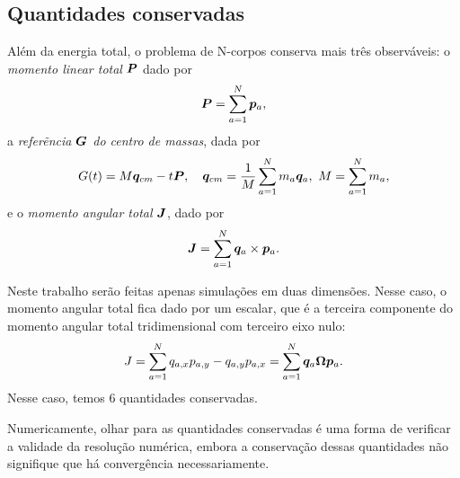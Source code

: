 \subsection{Quantidades conservadas}

Além da energia total, o problema de N-corpos conserva mais três observáveis: o \textit{momento linear total} $\bm P$ dado por
\begin{equation}
\bm P = \sum_{a=1}^N \bm p_a,
\end{equation}
a \textit{referẽncia $\bm G$ do centro de massas}, dada por
\begin{equation}
G(t) = M \bm q_{cm} - t \bm P,
\quad
\bm q_{cm} = \dfrac{1}{M} \sum_{a=1}^N m_a \bm q_a,
\
M = \sum_{a=1}^N m_a,
\end{equation}
e o \textit{momento angular total} $\bm J$, dado por
\begin{equation}
\bm J = \sum_{a=1}^N \bm q_a \times \bm p_a.
\end{equation}

Neste trabalho serão feitas apenas simulações em duas dimensões. Nesse caso, o momento angular total fica dado por um escalar, que é a terceira componente do momento angular total tridimensional com terceiro eixo nulo:
\begin{equation}
J = \sum_{a=1}^N q_{a,x} p_{a,y} - q_{a,y} p_{a,x} = \sum_{a=1}^N \bm q_a \bm \Omega \bm p_a.
\end{equation}
Nesse caso, temos 6 quantidades conservadas.

Numericamente, olhar para as quantidades conservadas é uma forma de verificar a validade da resolução numérica, embora a conservação dessas quantidades não signifique que há convergência necessariamente.

